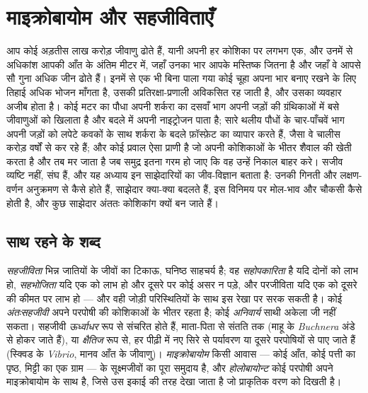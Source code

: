 \chapter{माइक्रोबायोम और सहजीविताएँ}\label{ch:b3:microbiomes}

आप कोई अड़तीस लाख करोड़ जीवाणु ढोते हैं, यानी अपनी हर कोशिका पर लगभग
एक, और उनमें से अधिकांश आपकी आँत के अंतिम मीटर में, जहाँ उनका भार आपके
मस्तिष्क जितना है और जहाँ वे आपसे सौ गुना अधिक जीन ढोते हैं। इनमें से
एक भी बिना पाला गया कोई चूहा अपना भार बनाए रखने के लिए तिहाई अधिक भोजन
माँगता है, उसकी प्रतिरक्षा-प्रणाली अविकसित रह जाती है, और उसका व्यवहार
अजीब होता है। कोई मटर का पौधा अपनी शर्करा का दसवाँ भाग अपनी जड़ों की
ग्रंथिकाओं में बसे जीवाणुओं को खिलाता है और बदले में अपनी नाइट्रोजन
पाता है; सारे थलीय पौधों के चार-पाँचवें भाग अपनी जड़ों को लपेटे कवकों के
साथ शर्करा के बदले फ़ॉस्फ़ेट का व्यापार करते हैं, जैसा वे चालीस करोड़
वर्षों से कर रहे हैं; और कोई प्रवाल ऐसा प्राणी है जो अपनी कोशिकाओं के
भीतर शैवाल की खेती करता है और तब मर जाता है जब समुद्र इतना गरम हो जाए
कि वह उन्हें निकाल बाहर करे। सजीव व्यष्टि नहीं, संघ हैं, और यह अध्याय
इन साझेदारियों का जीव-विज्ञान बताता है: उनकी गिनती और लक्षण-वर्णन
अनुक्रमण से कैसे होते हैं, साझेदार क्या-क्या बदलते हैं, इस विनिमय पर
मोल-भाव और चौकसी कैसे होती है, और कुछ साझेदार अंततः कोशिकांग क्यों बन
जाते हैं।

\section{साथ रहने के शब्द}

\begin{definition}[सहजीविता]\label{def:b3:microbiomes:symbiosis}
\emph{सहजीविता} भिन्न जातियों के जीवों का टिकाऊ, घनिष्ठ साहचर्य है; वह
\emph{सहोपकारिता} है यदि दोनों को लाभ हो, \emph{सहभोजिता} यदि एक को लाभ
हो और दूसरे पर कोई असर न पड़े, और परजीविता यदि एक को दूसरे की कीमत पर
लाभ हो --- और वही जोड़ी परिस्थितियों के साथ इस रेखा पर सरक सकती है।
कोई \emph{अंतःसहजीवी} अपने परपोषी की कोशिकाओं के भीतर रहता है; कोई
\emph{अनिवार्य} साथी अकेला जी नहीं सकता। सहजीवी \emph{ऊर्ध्वाधर} रूप
से संचरित होते हैं, माता-पिता से संतति तक (माहू के \emph{Buchnera}
अंडे से होकर जाते हैं), या \emph{क्षैतिज} रूप से, हर पीढ़ी में नए सिरे
से पर्यावरण या दूसरे परपोषियों से पाए जाते हैं (स्क्विड के
\emph{Vibrio}, मानव आँत के जीवाणु)। \emph{माइक्रोबायोम} किसी आवास ---
कोई आँत, कोई पत्ती का पृष्ठ, मिट्टी का एक ग्राम --- के सूक्ष्मजीवों का
पूरा समुदाय है, और \emph{होलोबायोन्ट} कोई परपोषी अपने माइक्रोबायोम के
साथ है, जिसे उस इकाई की तरह देखा जाता है जो प्राकृतिक वरण को दिखती है।
\end{definition}

